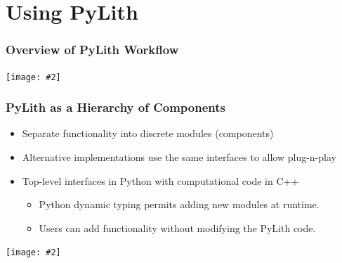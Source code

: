 \documentclass[aspectratio=169,hyperref=colorlinks]{beamer}
\newcommand{\includefigure}[2][]{{\centering\texttt{[image: \#2]}\par}}
\begin{document}
\section{Using PyLith}

\begin{frame}
  \frametitle{Overview of PyLith Workflow}
  \summary{}

  \includefigure[height=7.2cm]{figs/runpylith}
\end{frame}

\begin{frame}
  \frametitle{PyLith as a Hierarchy of Components}

  \begin{minipage}{0.53\textwidth}
    \begin{itemize}
    \item Separate functionality into discrete modules (components)
    \item Alternative implementations use the same interfaces to allow plug-n-play
    \item Top-level interfaces in Python with computational code in C++
      \begin{itemize}
      \item Python dynamic typing permits adding new modules at runtime.
      \item Users can add functionality without modifying the PyLith code.
      \end{itemize}
    \end{itemize}
  \end{minipage}\hfill
  \begin{minipage}{0.43\textwidth}
    \includefigure[height=5cm]{figs/component}
  \end{minipage}

\end{frame}
\end{document}
